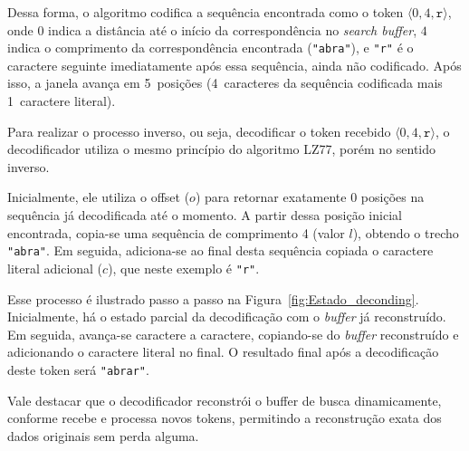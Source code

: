 Dessa forma, o algoritmo codifica a sequência encontrada como o token $\langle
  0, 4, \texttt{r} \rangle$, onde $0$ indica a distância até o início da
correspondência no \textit{search buffer}, $4$ indica o comprimento da
correspondência encontrada (\texttt{"abra"}), e \texttt{"r"} é o caractere
seguinte imediatamente após essa sequência, ainda não codificado. Após isso, a
janela avança em 5~posições (4~caracteres da sequência codificada mais
1~caractere literal).

Para realizar o processo inverso, ou seja, decodificar o token recebido
$\langle 0, 4, \texttt{r} \rangle$, o decodificador utiliza o mesmo princípio
do algoritmo LZ77, porém no sentido inverso.

Inicialmente, ele utiliza o offset ($o$) para retornar exatamente 0 posições na
sequência já decodificada até o momento. A partir dessa posição inicial
encontrada, copia-se uma sequência de comprimento 4 (valor $l$), obtendo o
trecho \texttt{"abra"}. Em seguida, adiciona-se ao final desta sequência
copiada o caractere literal adicional ($c$), que neste exemplo é \texttt{"r"}.

Esse processo é ilustrado passo a passo na Figura~\ref{fig:Estado_deconding}.
Inicialmente, há o estado parcial da decodificação com o \textit{buffer} já
reconstruído. Em seguida, avança-se caractere a caractere, copiando-se do
\textit{buffer} reconstruído e adicionando o caractere literal no final. O
resultado final após a decodificação deste token será \texttt{"abrar"}.

Vale destacar que o decodificador reconstrói o buffer de busca dinamicamente,
conforme recebe e processa novos tokens, permitindo a reconstrução exata dos
dados originais sem perda alguma.


